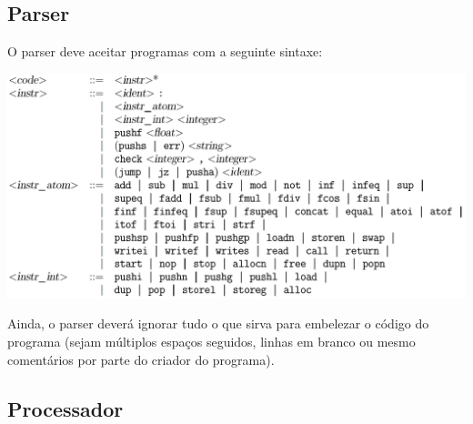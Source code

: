 \documentclass{report}
\begin{document}
\subsection{Parser}

\quad O parser deve aceitar programas com a seguinte sintaxe:

\begin{center}
\includegraphics[width=\textwidth]{sintaxe.png}
\end{center}





\quad Ainda, o parser deverá ignorar tudo o que sirva para embelezar o código do programa (sejam múltiplos espaços seguidos, linhas em branco ou mesmo
comentários por parte do criador do programa).

\subsection{Processador}
\end{document}
